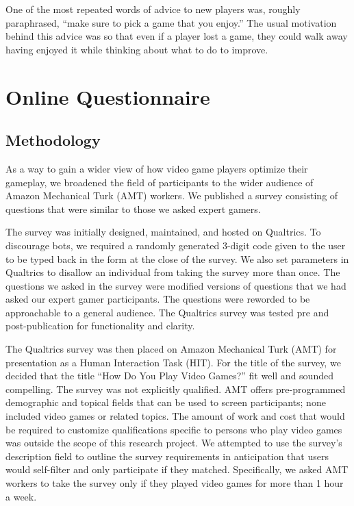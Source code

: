 \documentclass[sigconf]{acmart}
\begin{document}
One of the most repeated words of advice to new players was, roughly paraphrased, “make sure to pick a game that you enjoy.” The usual motivation behind this advice was so that even if a player lost a game, they could walk away having enjoyed it while thinking about what to do to improve.


\section{Online Questionnaire}

\subsection{Methodology}
As a way to gain a wider view of how video game players optimize their gameplay, we broadened the field of participants to the wider audience of Amazon Mechanical Turk (AMT) workers. We published a survey consisting of questions that were similar to those we asked expert gamers. 

The survey was initially designed, maintained, and hosted on Qualtrics. To discourage bots, we required a randomly generated 3-digit code given to the user to be typed back in the form at the close of the survey. We also set parameters in Qualtrics to disallow an individual from taking the survey more than once. The questions we asked in the survey were modified versions of questions that we had asked our expert gamer participants. The questions were reworded to be approachable to a general audience. The Qualtrics survey was tested pre and post-publication for functionality and clarity.

The Qualtrics survey was then placed on Amazon Mechanical Turk (AMT) for presentation as a Human Interaction Task (HIT). For the title of the survey, we decided that the title “How Do You Play Video Games?” fit well and sounded compelling. The survey was not explicitly qualified. AMT offers pre-programmed demographic and topical fields that can be used to screen participants; none included video games or related topics. The amount of work and cost that would be required to customize qualifications specific to persons who play video games was outside the scope of this research project. We attempted to use the survey’s description field to outline the survey requirements in anticipation that users would self-filter and only participate if they matched. Specifically, we asked AMT workers to take the survey only if they played video games for more than 1 hour a week. 
\end{document}
